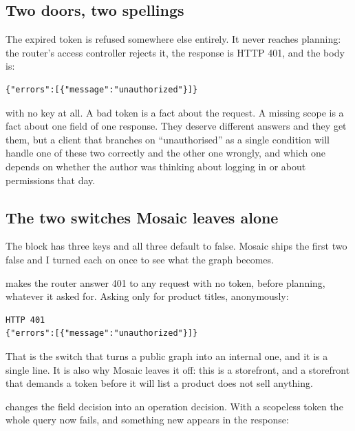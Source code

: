 \subsection*{Two doors, two spellings}

%
The expired token is refused somewhere else entirely. It never reaches
planning: the router's access controller rejects it, the response is HTTP 401,
and the body is:

\begin{verbatim}
{"errors":[{"message":"unauthorized"}]}
\end{verbatim}

with no  key at all. A bad token is a fact about the request. A
missing scope is a fact about one field of one response. They deserve different
answers and they get them, but a client that branches on
\enquote{unauthorised} as a single condition will handle one of these two
correctly and the other one wrongly, and which one depends on whether the
author was thinking about logging in or about permissions that day.

\subsection*{The two switches Mosaic leaves alone}

%
The  block has three keys and all three default to false.
Mosaic ships the first two false and I turned each on once to see what the
graph becomes.

 makes the router answer 401 to any request
with no token, before planning, whatever it asked for. Asking only for product
titles, anonymously:

\begin{verbatim}
HTTP 401
{"errors":[{"message":"unauthorized"}]}
\end{verbatim}

That is the switch that turns a public graph into an internal one, and it is a
single line. It is also why Mosaic leaves it off: this is a storefront, and a
storefront that demands a token before it will list a product does not sell
anything.

%
 changes the field decision
into an operation decision. With a scopeless token the whole query now fails,
and something new appears in the response:

